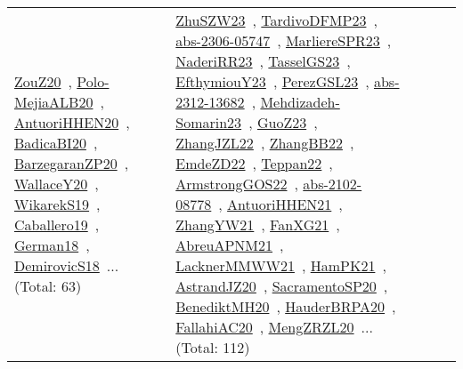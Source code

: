 {\begin{longtable}{lp{3cm}>{\raggedright\arraybackslash}p{6cm}>{\raggedright\arraybackslash}p{6cm}>{\raggedright\arraybackslash}p{8cm}}
\href{../works/ZouZ20.pdf}{ZouZ20}~\cite{ZouZ20}, \href{../works/Polo-MejiaALB20.pdf}{Polo-MejiaALB20}~\cite{Polo-MejiaALB20}, \href{../works/AntuoriHHEN20.pdf}{AntuoriHHEN20}~\cite{AntuoriHHEN20}, \href{../works/BadicaBI20.pdf}{BadicaBI20}~\cite{BadicaBI20}, \href{../works/BarzegaranZP20.pdf}{BarzegaranZP20}~\cite{BarzegaranZP20}, \href{../works/WallaceY20.pdf}{WallaceY20}~\cite{WallaceY20}, \href{../works/WikarekS19.pdf}{WikarekS19}~\cite{WikarekS19}, \href{../works/Caballero19.pdf}{Caballero19}~\cite{Caballero19}, \href{../works/German18.pdf}{German18}~\cite{German18}, \href{../works/DemirovicS18.pdf}{DemirovicS18}~\cite{DemirovicS18}... (Total: 63) & \href{../works/ZhuSZW23.pdf}{ZhuSZW23}~\cite{ZhuSZW23}, \href{../works/TardivoDFMP23.pdf}{TardivoDFMP23}~\cite{TardivoDFMP23}, \href{../works/abs-2306-05747.pdf}{abs-2306-05747}~\cite{abs-2306-05747}, \href{../works/MarliereSPR23.pdf}{MarliereSPR23}~\cite{MarliereSPR23}, \href{../works/NaderiRR23.pdf}{NaderiRR23}~\cite{NaderiRR23}, \href{../works/TasselGS23.pdf}{TasselGS23}~\cite{TasselGS23}, \href{../works/EfthymiouY23.pdf}{EfthymiouY23}~\cite{EfthymiouY23}, \href{../works/PerezGSL23.pdf}{PerezGSL23}~\cite{PerezGSL23}, \href{../works/abs-2312-13682.pdf}{abs-2312-13682}~\cite{abs-2312-13682}, \href{../works/Mehdizadeh-Somarin23.pdf}{Mehdizadeh-Somarin23}~\cite{Mehdizadeh-Somarin23}, \href{../works/GuoZ23.pdf}{GuoZ23}~\cite{GuoZ23}, \href{../works/ZhangJZL22.pdf}{ZhangJZL22}~\cite{ZhangJZL22}, \href{../works/ZhangBB22.pdf}{ZhangBB22}~\cite{ZhangBB22}, \href{../works/EmdeZD22.pdf}{EmdeZD22}~\cite{EmdeZD22}, \href{../works/Teppan22.pdf}{Teppan22}~\cite{Teppan22}, \href{../works/ArmstrongGOS22.pdf}{ArmstrongGOS22}~\cite{ArmstrongGOS22}, \href{../works/abs-2102-08778.pdf}{abs-2102-08778}~\cite{abs-2102-08778}, \href{../works/AntuoriHHEN21.pdf}{AntuoriHHEN21}~\cite{AntuoriHHEN21}, \href{../works/ZhangYW21.pdf}{ZhangYW21}~\cite{ZhangYW21}, \href{../works/FanXG21.pdf}{FanXG21}~\cite{FanXG21}, \href{../works/AbreuAPNM21.pdf}{AbreuAPNM21}~\cite{AbreuAPNM21}, \href{../works/LacknerMMWW21.pdf}{LacknerMMWW21}~\cite{LacknerMMWW21}, \href{../works/HamPK21.pdf}{HamPK21}~\cite{HamPK21}, \href{../works/AstrandJZ20.pdf}{AstrandJZ20}~\cite{AstrandJZ20}, \href{../works/SacramentoSP20.pdf}{SacramentoSP20}~\cite{SacramentoSP20}, \href{../works/BenediktMH20.pdf}{BenediktMH20}~\cite{BenediktMH20}, \href{../works/HauderBRPA20.pdf}{HauderBRPA20}~\cite{HauderBRPA20}, \href{../works/FallahiAC20.pdf}{FallahiAC20}~\cite{FallahiAC20}, \href{../works/MengZRZL20.pdf}{MengZRZL20}~\cite{MengZRZL20}... (Total: 112)\\

\end{longtable}}
